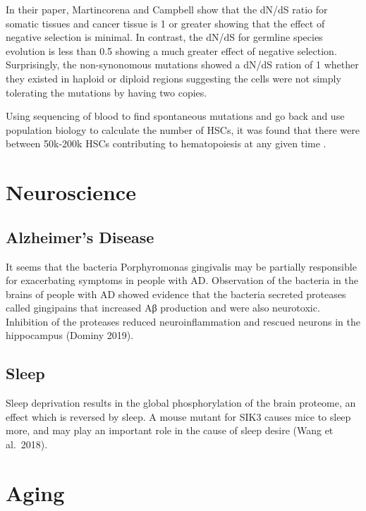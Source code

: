 \documentclass[]{book}
\begin{document}
In their paper, Martincorena and Campbell show that the dN/dS ratio for somatic tissues and cancer tissue is 1 or greater showing that the effect of negative selection is minimal. In contrast, the dN/dS for germline species evolution is less than 0.5 showing a much greater effect of negative selection. Surprisingly, the non-synonomous mutations showed a dN/dS ration of 1 whether they existed in haploid or diploid regions suggesting the cells were not simply tolerating the mutations by having two copies.

Using sequencing of blood to find spontaneous mutations and go back and use population biology to calculate the number of HSCs, it was found that there were between 50k-200k HSCs contributing to hematopoiesis at any given time \citep{lee2018population}.

\hypertarget{neurosci}{%
\chapter{Neuroscience}\label{neurosci}}

\hypertarget{alzheimers-disease}{%
\section{Alzheimer's Disease}\label{alzheimers-disease}}

It seems that the bacteria Porphyromonas gingivalis may be partially responsible for exacerbating symptoms in people with AD. Observation of the bacteria in the brains of people with AD showed evidence that the bacteria secreted proteases called gingipains that increased Aβ production and were also neurotoxic. Inhibition of the proteases reduced neuroinflammation and rescued neurons in the hippocampus (Dominy 2019).

\hypertarget{sleep}{%
\section{Sleep}\label{sleep}}

Sleep deprivation results in the global phosphorylation of the brain proteome, an effect which is reversed by sleep. A mouse mutant for SIK3 causes mice to sleep more, and may play an important role in the cause of sleep desire (Wang et al.~2018).

\hypertarget{aging}{%
\chapter{Aging}\label{aging}}
\end{document}
